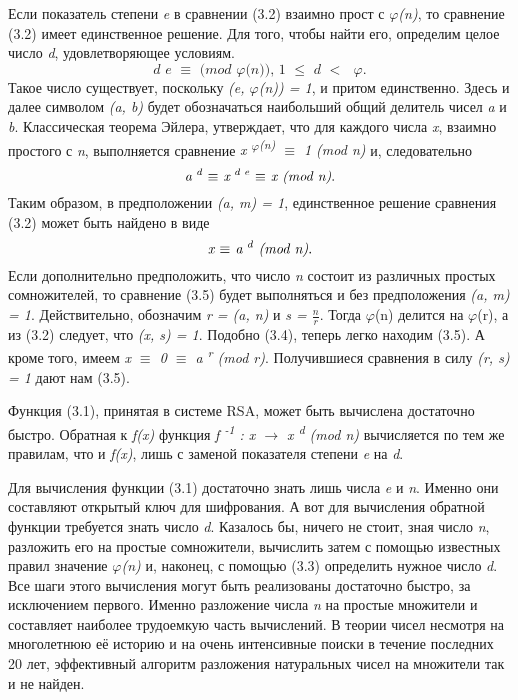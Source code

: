   Если показатель степени \textit{e} в сравнении (3.2) взаимно прост с \textit{{$\varphi$}(n)}, то сравнение (3.2) имеет единственное решение. 
Для того, чтобы найти его, определим целое число \textit{d}, удовлетворяющее условиям. 
\begin{equation}
 \textit{d e {$\equiv$} (mod {$\varphi$}(n)), 1 {$\leq$} d {$<$} {$\varphi$}}.
\end{equation}
Такое число существует, поскольку \textit{(e, {$\varphi$}(n)) = 1}, и притом единственно. Здесь и далее символом \textit{(a, b)} будет обозначаться 
наибольший общий делитель чисел \textit{a} и \textit{b}. Классическая теорема Эйлера, утверждает, что для каждого числа \textit{x}, взаимно простого 
с \textit{n}, выполняется сравнение \textit{x\textsuperscript{ {$\varphi$}(n)} {$\equiv$} 1 (mod n) } и, следовательно
\begin{equation}
 \textit{a\textsuperscript{ d} {$\equiv$} x\textsuperscript{ d e} {$\equiv$} x (mod n)}.
\end{equation}
Таким образом, в предположении \textit{(a, m) = 1}, единственное решение сравнения (3.2) может быть найдено в виде
\begin{equation}
 \textit{x {$\equiv$} a\textsuperscript{ d} (mod n)}.
\end{equation}
Если дополнительно предположить, что число \textit{n} состоит из различных простых сомножителей, то сравнение (3.5) будет выполняться и без 
предположения \textit{(a, m) = 1}. Действительно, обозначим \textit{r = (a, n)} и \textit{s = {$\frac{n}{r}$}}. Тогда {$\varphi$}(n) делится на {$\varphi$}(r), 
а из (3.2) следует, что \textit{(x, s) = 1}. Подобно (3.4), теперь легко находим (3.5). А кроме того, имеем \textit{x {$\equiv$} 0 {$\equiv$} a\textsuperscript{ r} (mod r)}. 
Получившиеся сравнения в силу \textit{(r, s) = 1} дают нам (3.5).

  Функция (3.1), принятая в системе RSA, может быть вычислена достаточно быстро. Обратная к \textit{f(x)} функция 
\textit{f\textsuperscript{ -1} : x {$\rightarrow$} x\textsuperscript{ d} (mod n) } вычисляется по тем же правилам, что и \textit{f(x)}, 
лишь с заменой показателя степени \textit{e} на \textit{d}.

  Для вычисления функции (3.1) достаточно знать лишь числа \textit{e} и \textit{n}. Именно они составляют открытый ключ для шифрования. 
А вот для вычисления обратной функции требуется знать число \textit{d}. Казалось бы, ничего не стоит, зная число \textit{n}, разложить 
его на простые сомножители, вычислить затем с помощью известных правил значение \textit{{$\varphi$}(n)} и, наконец, с помощью (3.3) определить 
нужное число \textit{d}. Все шаги этого вычисления могут быть реализованы достаточно быстро, за исключением первого. Именно разложение числа \textit{n} на 
простые множители и составляет наиболее трудоемкую часть вычислений. В теории чисел несмотря на многолетнюю её историю и на очень интенсивные поиски в течение последних 20 лет, 
эффективный алгоритм разложения натуральных чисел на множители так и не найден.


